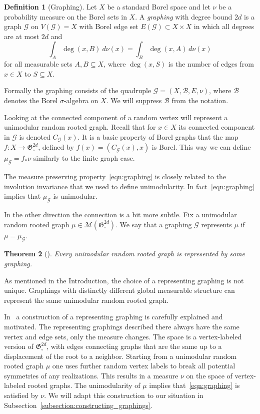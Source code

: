 \documentclass[11pt]{article}
\newtheorem{theo}{Theorem}[section]
\theoremstyle{definition}
\newtheorem{defi}[theo]{Definition}
\numberwithin{equation}{section}
\numberwithin{figure}{section}
\numberwithin{table}{section}
\newcommand{\G}{\mathcal{G}}
\newcommand{\clM}{\mathcal{M}}
\newcommand{\clB}{\mathcal{B}}
\newcommand{\GoG}{\mathfrak{G}}
\begin{document}
\begin{defi}[Graphing] \label{def:graphing}
Let $X$ be a standard Borel space and let $\nu$ be a probability measure on the Borel sets in $X$. A \emph{graphing} with degree bound $2d$ is a graph $\G$ on $V(\G) = X $ with Borel edge set $E(\G) \subset X \times X$ in which all degrees are at most $2d$ and
\begin{equation}\label{eqn:graphing}
\int_{A} \deg(x,B) \ d \nu (x) = \int_{B} \deg(x,A) \, d \nu (x)
\end{equation}
for all measurable sets $A,B \subseteq X$, where $\deg(x,S)$ is the number of edges from $x \in X$ to $S \subseteq X$.
\end{defi}

Formally the graphing consists of the quadruple $\G=(X,\clB, E, \nu)$, where $\clB$ denotes the Borel $\sigma$-algebra on $X$. We will suppress $\clB$ from the notation.

Looking at the connected component of a random vertex will represent a unimodular random rooted graph. Recall that for $x\in X$ its connected component in $\G$ is denoted $C_{\G}(x)$. It is a basic property of Borel graphs that the map $f : X \to \GoG_{\circ}^{2d}$, defined by $f(x)=(C_{\G}(x),x)$ is Borel. This way we can define $\mu_{\G} = f_{*} \nu$ similarly to the finite graph case.

The measure preserving property~\eqref{eqn:graphing} is closely related to the involution invariance that we used to define unimodularity. In fact~\eqref{eqn:graphing} implies that $\mu_{\G}$ is unimodular.

In the other direction the connection is a bit more subtle. Fix a unimodular random rooted graph $\mu \in \clM(\GoG_{\circ}^{2d})$. We say that a graphing $\G$ represents $\mu$ if $\mu=\mu_{\G}$.

\begin{theo}[\cite{aldous2007processes,elek2007note}] \label{theorem:representing_graphing}
Every unimodular random rooted graph is represented by some graphing.
\end{theo}

As mentioned in the Introduction, the choice of a representing graphing is not unique. Graphings with distinctly different global measurable structure can represent the same unimodular random rooted graph.

In~\cite[Theorem~18.37]{lovasz2012large} a construction of a representing graphing is carefully explained and motivated. The representing graphings described there always have the same vertex and edge sets, only the measure changes. The space is a vertex-labeled version of $\GoG_{\circ}^{2d}$, with edges connecting graphs that are the same up to a displacement of the root to a neighbor. Starting from a unimodular random rooted graph $\mu$ one uses further random vertex labels to break all potential symmetries of any realizations. This results in a measure $\nu$ on the space of vertex-labeled rooted graphs. The unimodularity of $\mu$ implies that~\eqref{eqn:graphing} is satisfied by $\nu$. We will adapt this construction to our situation in Subsection~\ref{subsection:constructing_graphings}.
\end{document}
